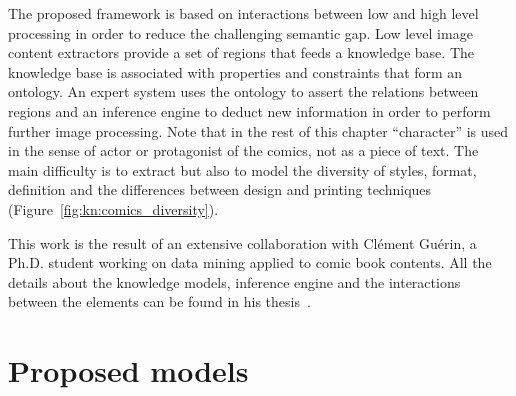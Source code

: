 The proposed framework is based on interactions between low and high level processing in order to reduce the challenging semantic gap.
Low level image content extractors provide a set of regions that feeds a knowledge base.
The knowledge base is associated with properties and constraints that form an ontology.
An expert system uses the ontology to assert the relations between regions and an inference engine to deduct new information in order to perform further image processing.
Note that in the rest of this chapter ``character'' is used in the sense of actor or protagonist of the comics, not as a piece of text.
The main difficulty is to extract but also to model the diversity of styles, format, definition and the differences between design and printing techniques (Figure~\ref{fig:kn:comics_diversity}).





This work is the result of an extensive collaboration with Cl{\'e}ment Gu{\'e}rin, a Ph.D. student working on data mining applied to comic book contents. All the details about the knowledge models, inference engine and the interactions between the elements can be found in his thesis~\cite{phdthesisGuerin14}.

\section{Proposed models} %
\label{sec:kn:proposed_models}

